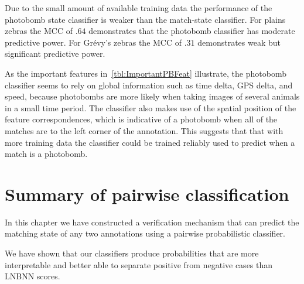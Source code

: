         Due to the small amount of available training data the performance of the photobomb state classifier is
          weaker than the match-state classifier.
        For plains zebras the MCC of $.64$ demonstrates that the photobomb classifier has moderate predictive
          power.
        For Grévy's zebras the MCC of $.31$ demonstrates weak but significant predictive power.

        As the important features in~\cref{tbl:ImportantPBFeat} illustrate, the photobomb classifier seems to
          rely on global information such as time delta, GPS delta, and speed, because photobombs are more likely
          when taking images of several animals in a small time period.
        The classifier also makes use of the spatial position of the feature correspondences, which is indicative
          of a photobomb when all of the matches are to the left corner of the annotation.
        This suggests that that with more training data the classifier could be trained reliably used to predict
          when a match is a photobomb.

        \ConfusionPhotobomb{}

        \EvalMetricsPhotobomb{}

        \ImportantPBFeat{}


\section{Summary of pairwise classification}\label{sec:pairconclusion}

    In this chapter we have constructed a verification mechanism that can predict the matching state of any two
      annotations using a pairwise probabilistic classifier.

    We have shown that our classifiers produce probabilities that are more
    interpretable and better able to separate positive from negative cases than
    LNBNN scores. 
